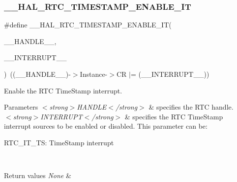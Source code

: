 \subsubsection{\texorpdfstring{\+\_\+\+\_\+\+H\+A\+L\+\_\+\+R\+T\+C\+\_\+\+T\+I\+M\+E\+S\+T\+A\+M\+P\+\_\+\+E\+N\+A\+B\+L\+E\+\_\+\+IT}{\_\_HAL\_RTC\_TIMESTAMP\_ENABLE\_IT}}
{\footnotesize\ttfamily \#define \+\_\+\+\_\+\+H\+A\+L\+\_\+\+R\+T\+C\+\_\+\+T\+I\+M\+E\+S\+T\+A\+M\+P\+\_\+\+E\+N\+A\+B\+L\+E\+\_\+\+IT(\begin{DoxyParamCaption}\item[{}]{\+\_\+\+\_\+\+H\+A\+N\+D\+L\+E\+\_\+\+\_\+,  }\item[{}]{\+\_\+\+\_\+\+I\+N\+T\+E\+R\+R\+U\+P\+T\+\_\+\+\_\+ }\end{DoxyParamCaption})~((\+\_\+\+\_\+\+H\+A\+N\+D\+L\+E\+\_\+\+\_\+)-\/$>$Instance-\/$>$CR $\vert$= (\+\_\+\+\_\+\+I\+N\+T\+E\+R\+R\+U\+P\+T\+\_\+\+\_\+))}



Enable the R\+TC Time\+Stamp interrupt. 


\begin{DoxyParams}{Parameters}
{\em $<$strong$>$\+H\+A\+N\+D\+L\+E$<$/strong$>$} & specifies the R\+TC handle. \\
\hline
{\em $<$strong$>$\+I\+N\+T\+E\+R\+R\+U\+P\+T$<$/strong$>$} & specifies the R\+TC Time\+Stamp interrupt sources to be enabled or disabled. This parameter can be\+: \begin{DoxyItemize}
\item R\+T\+C\+\_\+\+I\+T\+\_\+\+TS\+: Time\+Stamp interrupt \end{DoxyItemize}
\\
\hline
\end{DoxyParams}

\begin{DoxyRetVals}{Return values}
{\em None} & \\
\hline
\end{DoxyRetVals}
\mbox{\label{group___r_t_c_ex___timestamp_ga72799940c34e70df0d33eca772794813}} 
